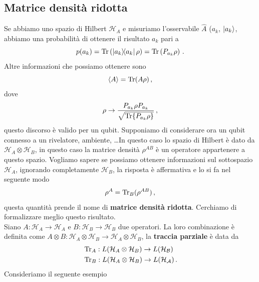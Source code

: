 \subsection{Matrice densità ridotta}
Se abbiamo uno spazio di Hilbert $\mathcal{H}_A$ e misuriamo l'osservabile $\hat A$ ($a_k$, $\ket{a_k}$, abbiamo una probabilità di ottenere il risultato $a_k$ pari a
\begin{equation*}
    p(a_k)=\Tr\left(\op{a_k}{a_k}\rho\right)=\Tr\left(P_{a_k}\rho\right) \, .
\end{equation*}
Altre informazioni che possiamo ottenere sono
\begin{equation*}
    \expval{A}=\Tr(A\rho) \, ,
\end{equation*}
dove
\begin{equation*}
    \rho \rightarrow \frac{P_{a_k}\rho P_{a_k}}{\sqrt{\Tr{P_{a_k}\rho}}} \, ,
\end{equation*}
questo discorso è valido per un qubit. Supponiamo di considerare ora un qubit connesso a un rivelatore, ambiente, \dots In questo caso lo spazio di Hilbert è dato da $\mathcal{H}_A \otimes \mathcal{H}_B$, in questo caso la matrice densità $\rho^{AB}$ è un operatore appartenere a questo spazio. Vogliamo sapere se possiamo ottenere informazioni sul sottospazio $\mathcal{H}_A$, ignorando completamente $\mathcal{H}_B$, la risposta è affermativa e lo si fa nel seguente modo
\begin{equation*}
    \rho^A = \Tr_B(\rho^{AB}) \, ,
\end{equation*}
questa quantità prende il nome di \textbf{matrice densità ridotta}. Cerchiamo di formalizzare meglio questo risultato. \\
Siano $A:\mathcal{H}_A \rightarrow \mathcal{H}_A$ e $B:\mathcal{H}_B \rightarrow \mathcal{H}_B$ due operatori. La loro combinazione è definita come $A \otimes B:\mathcal{H}_A\otimes \mathcal{H}_B \rightarrow \mathcal{H}_A\otimes\mathcal{H}_B$, la \textbf{traccia parziale} è data da
\begin{align*}
    &\Tr_A : L(\mathcal{H}_A\otimes \mathcal{H}_B) \rightarrow L(\mathcal{H_B}) \\
    &\Tr_B : L(\mathcal{H}_A\otimes \mathcal{H}_B) \rightarrow L(\mathcal{H_A}) \, .
\end{align*}
Consideriamo il seguente esempio
